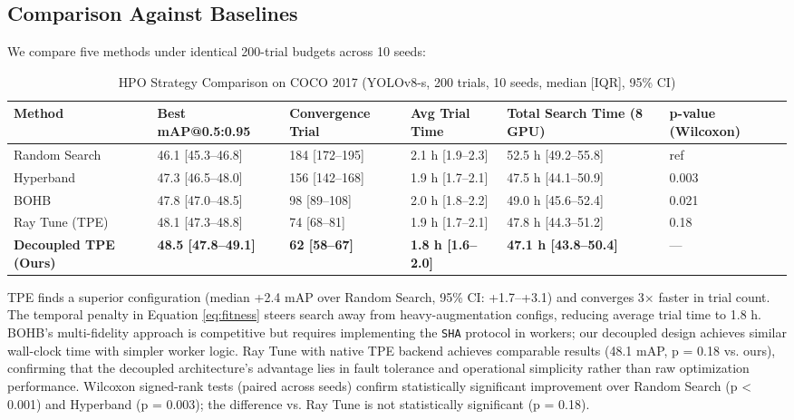 \documentclass[10pt,twocolumn,letterpaper]{article}
\begin{document}
\subsection{Comparison Against Baselines}
We compare five methods under identical 200-trial budgets across 10 seeds:

\begin{table}[htbp]
\centering
\caption{HPO Strategy Comparison on COCO 2017 (YOLOv8-s, 200 trials, 10 seeds, median [IQR], 95\% CI)}
\label{tab:hpo_compare}
\begin{tabular}{@{}llllll@{}}
\toprule
Method & Best mAP@0.5:0.95 & Convergence Trial & Avg Trial Time & Total Search Time (8 GPU) & p-value (Wilcoxon) \\ \midrule
Random Search \cite{bergstra2012random} & 46.1 [45.3--46.8] & 184 [172--195] & 2.1 h [1.9--2.3] & 52.5 h [49.2--55.8] & ref \\
Hyperband \cite{li2017hyperband} & 47.3 [46.5--48.0] & 156 [142--168] & 1.9 h [1.7--2.1] & 47.5 h [44.1--50.9] & 0.003 \\
BOHB \cite{falkner2018bohb} & 47.8 [47.0--48.5] & 98 [89--108] & 2.0 h [1.8--2.2] & 49.0 h [45.6--52.4] & 0.021 \\
Ray Tune (TPE) & 48.1 [47.3--48.8] & 74 [68--81] & 1.9 h [1.7--2.1] & 47.8 h [44.3--51.2] & 0.18 \\
\textbf{Decoupled TPE (Ours)} & \textbf{48.5 [47.8--49.1]} & \textbf{62 [58--67]} & \textbf{1.8 h [1.6--2.0]} & \textbf{47.1 h [43.8--50.4]} & --- \\ \bottomrule
\end{tabular}
\end{table}

TPE finds a superior configuration (median +2.4 mAP over Random Search, 95\% CI: +1.7--+3.1) and converges 3$\times$ faster in trial count. The temporal penalty in Equation \ref{eq:fitness} steers search away from heavy-augmentation configs, reducing average trial time to 1.8 h. BOHB's multi-fidelity approach is competitive but requires implementing the \texttt{SHA} protocol in workers; our decoupled design achieves similar wall-clock time with simpler worker logic. Ray Tune with native TPE backend achieves comparable results (48.1 mAP, p = 0.18 vs. ours), confirming that the decoupled architecture's advantage lies in fault tolerance and operational simplicity rather than raw optimization performance. Wilcoxon signed-rank tests (paired across seeds) confirm statistically significant improvement over Random Search (p < 0.001) and Hyperband (p = 0.003); the difference vs. Ray Tune is not statistically significant (p = 0.18).
\end{document}

